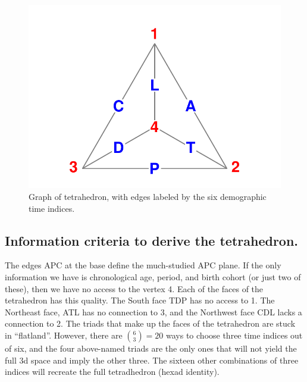 \documentclass[11pt,oneside,a4paper]{article} %
\begin{document}
\begin{figure}[h!]
\centering
\caption{Graph of tetrahedron, with edges labeled by the six demographic time
indices.}
\label{fig:tet}
\includegraphics[scale=1]{Figures/TetraHedronVerticesEdges.pdf}
\end{figure}

\subsection*{Information criteria to derive the tetrahedron.}
The edges APC at the base define the much-studied APC plane. If the only
information we have is chronological age, period, and birth cohort (or just two
of these), then we have no access to the vertex 4. Each of the faces of the
tetrahedron has this quality. The South face TDP has no access to 1.
The Northeast face, ATL has no connection to 3, and the Northwest face
CDL lacks a connection to 2. The triads that make up the faces of
the tetrahedron are stuck in ``flatland''. However, there are $\binom{6}{3}=20$ ways to choose three time indices out of six, and the four
above-named triads are the only ones that will not yield the full 3d
space and imply the other three. The sixteen other combinations of three indices will recreate the full tetradhedron (hexad identity).



\end{document}
